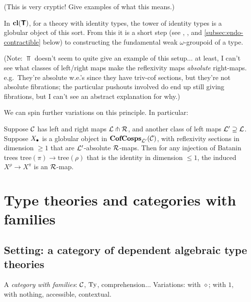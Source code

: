 \documentclass{amsart}
\newcommand{\tr}{\mathrm{tree}}
\begin{document}
(This is very cryptic!  Give examples of what this means.)

\begin{example}
In $\mathbf{cl}(\textbf{\textsf{T}})$, for a theory with identity types, the tower of identity types is a globular object of this sort.  From this it is a short step (see \cite{lumsdaine:tlca-journal}, \cite{garner-van-den-berg}, and \ref{subsec:endo-contractible} below) to constructing the fundamental weak $\omega$-groupoid of a type.
\end{example}

(Note: $\Top$ doesn't seem to quite give an example of this setup$\ldots$ at least, I can't see what classes of left/right maps make the reflexivity maps \emph{absolute} right-maps.  e.g.\ They're absolute w.e.'s since they have triv-cof sections, but they're not absolute fibrations; the particular pushouts involved do end up still giving fibrations, but I can't see an abstract explanation for why.)

We can spin further variations on this principle.  In particular:

\begin{proposition}
Suppose $\mathcal{C}$ has left and right maps $\mathcal{L} \pitchfork \mathcal{R}$, and another class of left maps $\mathcal{L}' \supseteq \mathcal{L}$.  Suppose $X_\bullet$ is a globular object in $\mathbf{CofCosps}_{\mathcal{L}'}(\mathcal{C})$, with reflexivity sections in dimension $\geq 1$ that are $\mathcal{L}'$-absolute $\mathcal{R}$-maps.  Then for any injection of Batanin trees $\tr(\pi) \to \tr(\rho)$ that is the identity in dimension $\leq 1$, the induced $X^\rho \to X^\pi$ is an $\mathcal{R}$-map.
\end{proposition}











\section{Type theories and categories with families}

\subsection{Setting: a category of dependent algebraic type theories}

\begin{definition}A \emph{category with families}: $\mathcal{C}$, $\mathrm{Ty}$, comprehension$\ldots$  Variations: with $\diamond$; with $1$, with nothing, accessible, contextual.
\end{definition}
\end{document}
